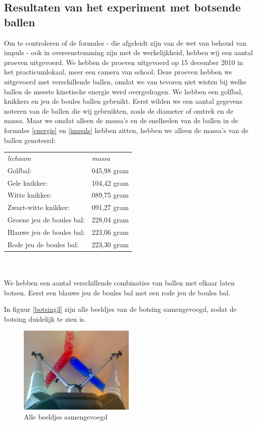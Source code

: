 \documentclass[12pt,a4paper]{article}
\begin{document}
	\subsection{Resultaten van het experiment met botsende ballen}
	Om te controleren of de formules - die afgeleidt zijn van de wet van behoud van impuls - ook in overeenstemming zijn met de werkelijkheid, hebben wij een aantal proeven uitgevoerd. We hebben de proeven uitgevoerd op 15 december 2010 in het practicumlokaal, meer een camera van school. Deze proeven hebben we uitgevoerd met verschillende ballen, omdat we van tevoren niet wisten bij welke ballen de meeste kinetische energie werd overgedragen. We hebben een golfbal, knikkers en jeu de boules ballen gebruikt. Eerst wilden we een aantal gegevens noteren van de ballen die wij gebruikten, zoals de diameter of omtrek en de massa. Maar we omdat alleen de massa's en de snelheden van de ballen in de formules \eqref{energie} en \eqref{impuls} hebben zitten, hebben we alleen de massa's van de ballen genoteerd:

	\begin{tabular}{|  l l |}
		\hline 
			\emph{lichaam} &\emph{massa}\\
			Golfbal: &045,98 gram\\
			Gele knikker: &104,42 gram\\
			Witte knikker: &089,75 gram\\
			Zwart-witte knikker: &091,27 gram\\
			Groene jeu de boules bal: &228,04 gram\\
			Blauwe jeu de boules bal: &223,06 gram\\
			Rode jeu de boules bal: &223,30 gram\\
		\hline 
	\end{tabular}
	\\
	\\We hebben een aantal verschillende combinaties van ballen met elkaar laten botsen. Eerst een blauwe jeu de boules bal met een rode jeu de boules bal.

	In figuur \eqref{botsing3} zijn alle beeldjes van de botsing samengevoegd, zodat de botsing duidelijk te zien is.
	
	\begin{figure}[H]
		\centerline{\includegraphics[width=0.5\textwidth]{Plaatjes/botsing3.jpg}}
		\caption{Alle beeldjes samengevoegd}
		\label{botsing3}
	\end{figure}
\end{document}
